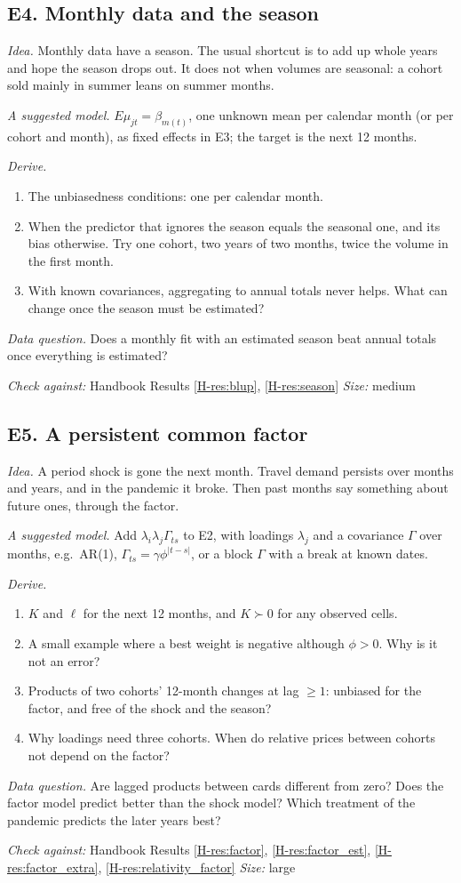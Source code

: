\documentclass[10pt]{article}
\newcommand{\hb}[1]{\ref*{H-#1}}
\newcommand{\ext}[7]{%
  \subsection*{#1}
  \textit{Idea.} #2\par\smallskip
  \textit{A suggested model.} #3\par\smallskip
  \textit{Derive.}
  \begin{enumerate}\setlength{\itemsep}{1pt}\setlength{\parskip}{0pt}#4\end{enumerate}
  \textit{Data question.} #5\par\smallskip
  {\small\textit{Check against:} Handbook #6 \quad\textperiodcentered\quad \textit{Size:} #7}\par}
\begin{document}
\ext{E4. Monthly data and the season}
{Monthly data have a season. The usual shortcut is to add up whole years and hope the season drops
out. It does not when volumes are seasonal: a cohort sold mainly in summer leans on summer months.}
{$E\mu_{jt} = \beta_{m(t)}$, one unknown mean per calendar month (or per cohort and month), as fixed
effects in E3; the target is the next 12 months.}
{\item The unbiasedness conditions: one per calendar month.
 \item When the predictor that ignores the season equals the seasonal one, and its bias otherwise.
   Try one cohort, two years of two months, twice the volume in the first month.
 \item With known covariances, aggregating to annual totals never helps. What can change once the
   season must be estimated?}
{Does a monthly fit with an estimated season beat annual totals once everything is estimated?}
{Results \hb{res:blup}, \hb{res:season}}{medium}

\ext{E5. A persistent common factor}
{A period shock is gone the next month. Travel demand persists over months and years, and in the
pandemic it broke. Then past months say something about future ones, through the factor.}
{Add $\lambda_i\lambda_j\Gamma_{ts}$ to E2, with loadings $\lambda_j$ and a covariance $\Gamma$ over
months, e.g.\ AR(1), $\Gamma_{ts} = \gamma\phi^{|t-s|}$, or a block $\Gamma$ with a break at known
dates.}
{\item $K$ and $\ell$ for the next 12 months, and $K \succ 0$ for any observed cells.
 \item A small example where a best weight is negative although $\phi > 0$. Why is it not an error?
 \item Products of two cohorts' 12-month changes at lag $\ge 1$: unbiased for the factor, and free
   of the shock and the season?
 \item Why loadings need three cohorts. When do relative prices between cohorts not depend on the
   factor?}
{Are lagged products between cards different from zero? Does the factor model predict better than
the shock model? Which treatment of the pandemic predicts the later years best?}
{Results \hb{res:factor}, \hb{res:factor_est}, \hb{res:factor_extra}, \hb{res:relativity_factor}}{large}
\end{document}
